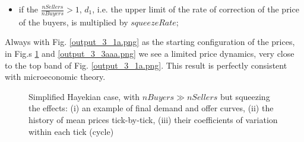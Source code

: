 \documentclass[10pt]{report}
\begin{document}
\begin{appendices}
\begin{itemize}
\item if the $\frac{nSellers}{nBuyers}>1$, $d_1$, i.e. the upper limit of the rate of correction of the price of the buyers, is multiplied by $squeezeRate$;
\end{itemize}


Always with Fig. \ref{output_3_1a.png} as the starting configuration of the prices, in Fig.s \ref{output_3_2aaa.png} and \ref{output_3_3aaa.png} we see a limited price dynamics, very close to the top band of Fig. \ref{output_3_1a.png}. This result is perfectly consistent with microeconomic theory.

\begin{figure}[H]
\begin{center}
\caption{Simplified Hayekian case, with $nBuyers \gg nSellers$ but squeezing the effects: (i) an example of final demand and offer curves, (ii) the history of mean prices tick-by-tick, (iii) their coefficients of variation within each tick (cycle)}
\label{output_3_2aaa.png}
\end{center}
\end{figure}


\end{appendices}
\end{document}
